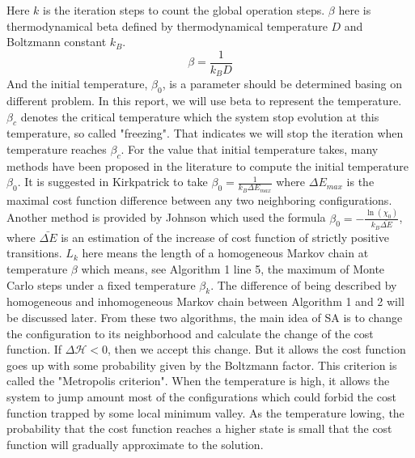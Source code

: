 \documentclass{turabian-researchpaper}
\begin{document}
        Here $k$ is the iteration steps to count the global operation steps. $\beta$ here is thermodynamical beta defined by thermodynamical temperature $D$ and Boltzmann constant $k_B$.
            \begin{equation}
                \beta = \frac{1}{k_B D}
            \end{equation}
        And the initial temperature, $\beta_0$, is a parameter should be determined basing on different problem. In this report, we will use beta to represent the temperature. $\beta_c$ denotes the critical temperature which the system stop evolution at this temperature, so called "freezing"\cite{chibante2010simulated}. That indicates we will stop the iteration when temperature reaches $\beta_c$. For the value that initial temperature takes, many methods have been proposed in the literature to compute the initial temperature $\beta_0$\cite{ben2004computing}. It is suggested in Kirkpatrick\cite{kirkpatrick1983optimization} to take $\beta_0 = \frac{1}{k_B \Delta E_{max}}$ where $\Delta E_{max}$ is the maximal cost function difference between any two neighboring configurations. Another method is provided by Johnson which used the formula $\beta_0 = -\frac{\ln(\chi_0)}{k_B\bar{\Delta E}}$, where $\bar{\Delta E}$ is an estimation of the increase of cost function of strictly positive transitions\cite{johnson1989optimization,johnson1991optimization}. $L_k$ here means the length of a homogeneous Markov chain at temperature $\beta$ which means, see Algorithm 1 line 5, the maximum of Monte Carlo steps under a fixed temperature $\beta_k$. The difference of being described by homogeneous and inhomogeneous Markov chain between Algorithm 1 and 2 will be discussed later. From these two algorithms, the main idea of SA is to change the configuration to its neighborhood and calculate the change of the cost function. If $\Delta \mathcal{H}  < 0$, then we accept this change. But it allows the cost function goes up with some probability given by the Boltzmann factor. This criterion is called the "Metropolis criterion"\cite{chibante2010simulated}. When the temperature is high, it allows the system to jump amount most of the configurations which could forbid the cost function trapped by some local minimum valley. As the temperature lowing, the probability that the cost function reaches a higher state is small that the cost function will gradually approximate to the solution.
\end{document}
